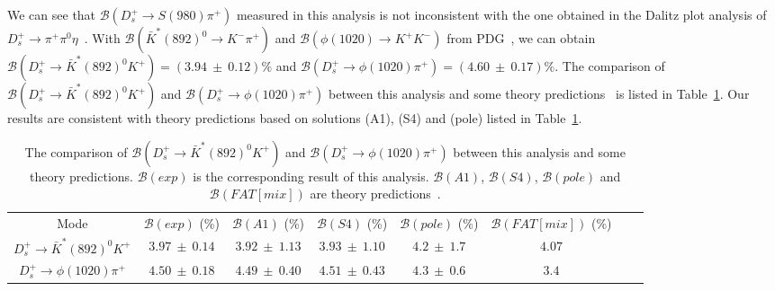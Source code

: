 {    We can see that $\mathcal{B}(D_{s}^{+} \rightarrow S(980)\pi^{+})$ measured in this analysis is not inconsistent with the one obtained in the Dalitz plot analysis of $D_{s}^{+} \rightarrow \pi^{+}\pi^{0}\eta$~\cite{Doc-DB-682-v7}.
    With $\mathcal{B}(\bar{K}^{*}(892)^{0} \rightarrow K^{-}\pi^{+})$ and $\mathcal{B}(\phi(1020) \rightarrow K^{+}K^{-})$ from PDG~\cite{PDG2018}, we can obtain $\mathcal{B}(D_{s}^{+} \rightarrow \bar{K}^{*}(892)^{0}K^{+}) = (3.94\ \pm\ 0.12)\%$ and $\mathcal{B}(D_{s}^{+} \rightarrow \phi(1020)\pi^{+}) = (4.60\ \pm\ 0.17)\%$.
    The comparison of  $\mathcal{B}(D_{s}^{+} \rightarrow \bar{K}^{*}(892)^{0}K^{+})$ and $\mathcal{B}(D_{s}^{+} \rightarrow \phi(1020)\pi^{+})$ between this analysis and some theory predictions~\cite{PRD93-114010} is listed in Table~\ref{theory-prediction}.
    Our results are consistent with theory predictions based on solutions (A1), (S4) and (pole) listed in Table~\ref{theory-prediction}.
    \begin{table}[htbp]
        \caption{The comparison of $\mathcal{B}(D_{s}^{+} \rightarrow \bar{K}^{*}(892)^{0}K^{+})$ and $\mathcal{B}(D_{s}^{+} \rightarrow \phi(1020)\pi^{+})$ between this analysis and some theory predictions.
            $\mathcal{B}(exp)$ is the corresponding result of this analysis.  $\mathcal{B}(A1)$, $\mathcal{B}(S4)$, $\mathcal{B}(pole)$ and $\mathcal{B}(FAT[mix])$ are theory predictions~\cite{PRD93-114010}. 
        }
        \label{theory-prediction}
        \begin{center}
            \begin{tabular}{cccccccc}
                \toprule\toprule
                Mode & $\mathcal{B}(exp)$ (\%)   & $\mathcal{B}(A1)$ (\%)& $\mathcal{B}(S4)$ (\%)&  $\mathcal{B}(pole)$ (\%)&$\mathcal{B}(FAT[mix])$ (\%)&\\
                $D_{s}^{+} \rightarrow \bar{K}^{*}(892)^{0}K^{+}$           & $3.97\ \pm\ 0.14$    & $3.92\ \pm\ 1.13$  & $3.93\ \pm\ 1.10$  & $4.2\ \pm\ 1.7$  & $4.07$  \\
                $D_{s}^{+} \rightarrow \phi(1020)\pi^{+}$                   & $4.50\ \pm\ 0.18$    & $4.49\ \pm\ 0.40$  & $4.51\ \pm\ 0.43$  & $4.3\ \pm\ 0.6$  & $3.4$  \\
                \hline
                \bottomrule\bottomrule
            \end{tabular}
        \end{center}
    \end{table}

}


